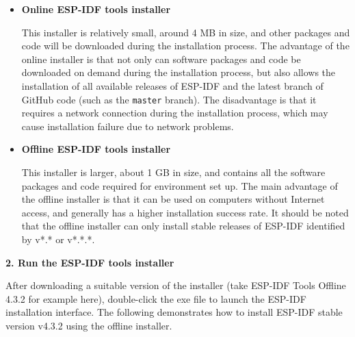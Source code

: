 \documentclass[a4paper,12pt]{book}
\begin{document}
\begin{itemize}
    \item \textbf{Online ESP-IDF tools installer}
    
    This installer is relatively small, around 4 MB in size, and other packages and code will be downloaded during the installation process. The advantage of the online installer is that not only can software packages and code be downloaded on demand during the installation process, but also allows the installation of all available releases of ESP-IDF and the latest branch of GitHub code (such as the \verb|master| branch). The disadvantage is that it requires a network connection during the installation process, which may cause installation failure due to network problems.
    
    \item \textbf{Offline ESP-IDF tools installer}
    
    This installer is larger, about 1 GB in size, and contains all the software packages and code required for environment set up. The main advantage of the offline installer is that it can be used on computers without Internet access, and generally has a higher installation success rate. It should be noted that the offline installer can only install stable releases of ESP-IDF identified by v*.* or v*.*.*.
\end{itemize}

\textbf{2. Run the ESP-IDF tools installer}

After downloading a suitable version of the installer (take ESP-IDF Tools Offline 4.3.2 for example here), double-click the exe file to launch the ESP-IDF installation interface. The following demonstrates how to install ESP-IDF stable version v4.3.2 using the offline installer.
\end{document}

